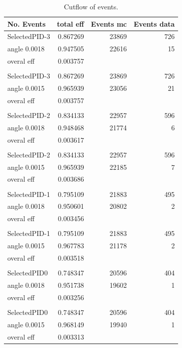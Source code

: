 \documentclass[12pt,a4paper]{article}
\begin{document}
\newpage
\begin{table}[h]
\centering
\begin{tabular}{lrrr}
\hline
 No. Events    &   total eff & Events mc & Events data\\
\hline
 SelectedPID-3 & 0.867269 & 23869     & 726 \\
 angle  0.0018 & 0.947505 & 22616     & 15\\
 \hline
 overal eff    & 0.003757 &           & \\
 \hline        &          &           \\
 SelectedPID-3 & 0.867269 & 23869     & 726 \\
 angle  0.0015 & 0.965939 & 23056     & 21\\
 \hline
 overal eff    & 0.003757 &           & \\
 \hline        &          &           \\
 SelectedPID-2 & 0.834133 & 22957     & 596 \\
 angle  0.0018 & 0.948468 & 21774     & 6\\
 \hline
 overal eff    & 0.003617 &           & \\
 \hline        &          &           \\
 SelectedPID-2 & 0.834133 & 22957     & 596 \\
 angle  0.0015 & 0.965939 & 22185     & 7\\
 \hline
 overal eff    & 0.003686 &           & \\
 \hline        &          &           \\
 SelectedPID-1 & 0.795109 & 21883     & 495 \\
 angle  0.0018 & 0.950601 & 20802     & 2\\
 \hline
 overal eff    & 0.003456 &           & \\
 \hline        &          &           \\
 SelectedPID-1 & 0.795109 & 21883     & 495 \\
 angle  0.0015 & 0.967783 & 21178     & 2\\
 \hline
 overal eff    & 0.003518 &           & \\
 \hline        &          &           \\
 SelectedPID0  & 0.748347 & 20596     & 404\\
 angle  0.0018 & 0.951738 & 19602     & 1\\
 \hline
 overal eff    & 0.003256 &           & \\
 \hline        &          &           \\
 SelectedPID0  & 0.748347 & 20596     & 404 \\
 angle  0.0015 & 0.968149 & 19940     & 1\\
 \hline
 overal eff    & 0.003313 &           & \\
\hline
\end{tabular}
\caption{Cutflow of events.}
\end{table}
\newpage 
\end{document}
